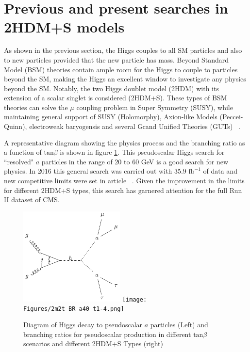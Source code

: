 \section{Previous and present searches in 2HDM+S models}

As shown in the previous section, the Higgs couples to all SM particles and also to new particles provided that the new particle has mass.  
Beyond Standard Model (BSM) theories contain ample room for the Higgs to couple to particles beyond the SM, making the Higgs an excellent window to investigate any physics beyond the SM.
Notably, the two Higgs doublet model (2HDM) with its extension of a scalar singlet is considered (2HDM+S).
These types of BSM theories can solve the $\mu$ coupling problem in Super Symmetry (SUSY), while maintaining general support of SUSY (Holomorphy), Axion-like Models (Peccei-Quinn), electroweak baryogensis and several Grand Unified Theories (GUTs) ~\cite{Branco_2012}.

A representative diagram showing the physics process and the branching ratio as a function of $\text{tan}\beta$ is shown in figure \ref{fig:feynman_haa}. This pseudoscalar Higgs search for ``resolved" $a$ particles in the range of $20$ to $60$ GeV is a good search for new physics.
In 2016 this general search was carried out with 35.9 $\text{fb}^{-1}$ of data and new competitive limits were set in article ~\cite{CMS-HIG-17-029}.
Given the improvement in the limits for different 2HDM+S types, this search has garnered attention for the full Run II dataset of CMS.

\begin{figure}[ht!b]
  \includegraphics[width=0.47\textwidth]{Figures/feynman_haa.pdf}
  \texttt{[image: Figures/2m2t\_BR\_a40\_t1-4.png]}\\
    \caption{\label{fig:feynman_haa} Diagram of Higgs decay to pseudoscalar $a$ particles (Left) and branching ratios for pseudoscalar production in different $\text{tan}\beta$ scenarios and different 2HDM+S Types (right)}
\end{figure}

